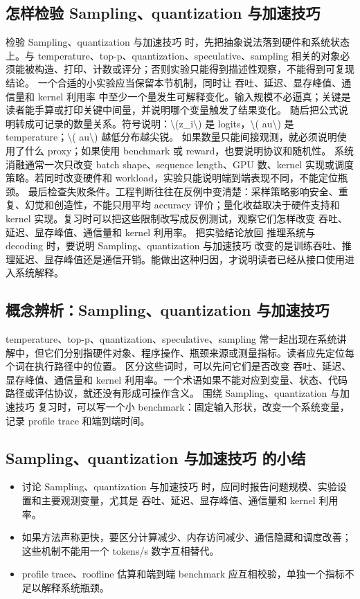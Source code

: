\documentclass[a4paper]{article}
\begin{document}
\subsection{怎样检验 Sampling、quantization 与加速技巧}
检验 Sampling、quantization 与加速技巧 时，先把抽象说法落到硬件和系统状态上。与 temperature、top-p、quantization、speculative、sampling 相关的对象必须能被构造、打印、计数或评分；否则实验只能得到描述性观察，不能得到可复现结论。
一个合适的小实验应当保留本节机制，同时让 吞吐、延迟、显存峰值、通信量和 kernel 利用率 中至少一个量发生可解释变化。输入规模不必逼真；关键是读者能手算或打印关键中间量，并说明哪个变量触发了结果变化。
随后把公式说明转成可记录的数量关系。符号说明：\textbackslash{}(z\_i\textbackslash{}) 是 logits，\textbackslash{}( au\textbackslash{}) 是 temperature；\textbackslash{}( au\textbackslash{}) 越低分布越尖锐。 如果数量只能间接观测，就必须说明使用了什么 proxy；如果使用 benchmark 或 reward，也要说明协议和随机性。
系统消融通常一次只改变 batch shape、sequence length、GPU 数、kernel 实现或调度策略。若同时改变硬件和 workload，实验只能说明端到端表现不同，不能定位瓶颈。
最后检查失败条件。工程判断往往在反例中变清楚：采样策略影响安全、重复、幻觉和创造性，不能只用平均 accuracy 评价；量化收益取决于硬件支持和 kernel 实现。复习时可以把这些限制改写成反例测试，观察它们怎样改变 吞吐、延迟、显存峰值、通信量和 kernel 利用率。
把实验结论放回 推理系统与 decoding 时，要说明 Sampling、quantization 与加速技巧 改变的是训练吞吐、推理延迟、显存峰值还是通信开销。能做出这种归因，才说明读者已经从接口使用进入系统解释。
\subsection{概念辨析：Sampling、quantization 与加速技巧}
temperature、top-p、quantization、speculative、sampling 常一起出现在系统讲解中，但它们分别指硬件对象、程序操作、瓶颈来源或测量指标。读者应先定位每个词在执行路径中的位置。
区分这些词时，可以先问它们是否改变 吞吐、延迟、显存峰值、通信量和 kernel 利用率。一个术语如果不能对应到变量、状态、代码路径或评估协议，就还没有形成可操作含义。
围绕 Sampling、quantization 与加速技巧 复习时，可以写一个小 benchmark：固定输入形状，改变一个系统变量，记录 profile trace 和端到端时间。
\subsection{Sampling、quantization 与加速技巧 的小结}
\begin{itemize}
\item 讨论 Sampling、quantization 与加速技巧 时，应同时报告问题规模、实验设置和主要观测变量，尤其是 吞吐、延迟、显存峰值、通信量和 kernel 利用率。
\item 如果方法声称更快，要区分计算减少、内存访问减少、通信隐藏和调度改善；这些机制不能用一个 tokens/s 数字互相替代。
\item profile trace、roofline 估算和端到端 benchmark 应互相校验，单独一个指标不足以解释系统瓶颈。
\end{itemize}
\end{document}
